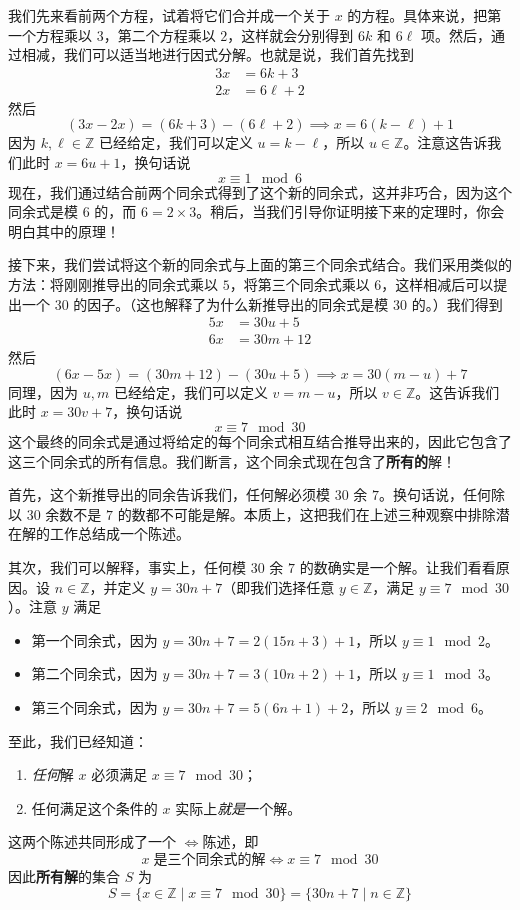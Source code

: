 我们先来看前两个方程，试着将它们合并成一个关于 $x$ 的方程。具体来说，把第一个方程乘以 $3$，第二个方程乘以 $2$，这样就会分别得到 $6k$ 和 $6\ell$ 项。然后，通过相减，我们可以适当地进行因式分解。也就是说，我们首先找到
\begin{align*}
    3x &= 6k + 3 \\
    2x &= 6\ell + 2
\end{align*}
然后
\[(3x - 2x) = (6k + 3) - (6\ell + 2) \implies x = 6(k - \ell) + 1\]
因为 $k, \ell \in \mathbb{Z}$ 已经给定，我们可以定义 $u = k-\ell$，所以 $u \in \mathbb{Z}$。注意这告诉我们此时 $x = 6u+1$，换句话说
\[x \equiv 1 \mod 6\]
现在，我们通过结合前两个同余式得到了这个新的同余式，这并非巧合，因为这个同余式是模 $6$ 的，而 $6 = 2 \times 3$。稍后，当我们引导你证明接下来的定理时，你会明白其中的原理！

接下来，我们尝试将这个新的同余式与上面的第三个同余式结合。我们采用类似的方法：将刚刚推导出的同余式乘以 $5$，将第三个同余式乘以 $6$，这样相减后可以提出一个 $30$ 的因子。（这也解释了为什么新推导出的同余式是模 $30$ 的。）我们得到
\begin{align*}
    5x &= 30u + 5 \\
    6x &= 30m + 12
\end{align*}
然后
\[(6x - 5x) = (30m + 12) - (30u + 5) \implies x = 30(m - u) + 7\]
同理，因为 $u,m$ 已经给定，我们可以定义 $v = m-u$，所以 $v \in \mathbb{Z}$。这告诉我们此时 $x = 30v+7$，换句话说
\[x \equiv 7 \mod 30\]
这个最终的同余式是通过将给定的每个同余式相互结合推导出来的，因此它包含了这三个同余式的所有信息。我们断言，这个同余式现在包含了\textbf{所有的}解！

首先，这个新推导出的同余告诉我们，任何解必须模 $30$ 余 $7$。换句话说，任何除以 $30$ 余数不是 $7$ 的数都不可能是解。本质上，这把我们在上述三种观察中排除潜在解的工作总结成一个陈述。

其次，我们可以解释，事实上，任何模 $30$ 余 $7$ 的数确实是一个解。让我们看看原因。设 $n \in \mathbb{Z}$，并定义 $y = 30n + 7$（即我们选择任意 $y \in \mathbb{Z}$，满足 $y \equiv 7 \mod 30$）。注意 $y$ 满足
\begin{itemize}
    \item 第一个同余式，因为 $y = 30n + 7 = 2(15n + 3) + 1$，所以 $y \equiv 1 \mod 2$。
    \item 第二个同余式，因为 $y = 30n + 7 = 3(10n + 2) + 1$，所以 $y \equiv 1 \mod 3$。
    \item 第三个同余式，因为 $y = 30n + 7 = 5( 6n + 1) + 2$，所以 $y \equiv 2 \mod 6$。
\end{itemize}
至此，我们已经知道：
\begin{enumerate}[label=(\arabic*)]
    \item \emph{任何}解 $x$ 必须满足 $x \equiv 7 \mod 30$；
    \item 任何满足这个条件的 $x$ 实际上\emph{就是}一个解。
\end{enumerate}
这两个陈述共同形成了一个 $\iff$陈述，即
\[x \;\text{是三个同余式的解} \iff x \equiv 7 \mod 30\]
因此\textbf{所有解}的集合 $S$ 为
\[S = \{x \in \mathbb{Z} \mid x \equiv 7 \mod 30\} = \{30n + 7 \mid n \in \mathbb{Z}\}\]

